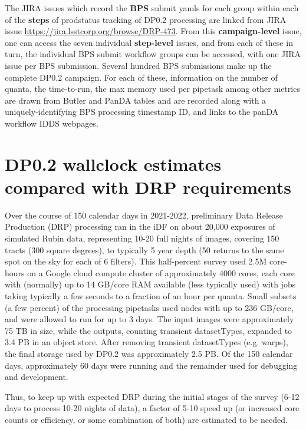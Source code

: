 \documentclass[OPS,authoryear,toc]{lsstdoc}
\begin{document}
The JIRA issues which record the {\bf BPS} submit yamls for each group
within each of the {\bf steps} of {\rm prodstatus} tracking of DP0.2
processing are linked from JIRA issue
\url{https://jira.lsstcorp.org/browse/DRP-473}.  From this 
{\bf campaign-level} issue, one can access the seven individual {\bf step-level}
issues, and from each of these in turn, the individual BPS submit
workflow groups can be accessed, with one JIRA issue per BPS submission. 
Several hundred BPS submissions make up the complete DP0.2 campaign.
For each of these, information on the number of quanta, 
the time-to-run, the max memory used per pipetask among 
other metrics are drawn from Butler and PanDA tables and are 
recorded along with a uniquely-identifying BPS processing timestamp ID, 
and links to the panDA workflow IDDS webpages.

\section{DP0.2 wallclock estimates compared with DRP requirements}

Over the course of 150 calendar days in 2021-2022, preliminary Data
Release Production (DRP) processing ran in the iDF on about 20,000
exposures of simulated Rubin data, representing 10-20 full nights of
images, covering 150 tracts (300 square degrees), to typically 5 year
depth (50 returns to the same spot on the sky for each of 6 filters).
This half-percent survey used 2.5M core-hours on a Google cloud compute 
cluster of approximately 4000 cores, each core with (normally) up 
to 14 GB/core RAM available (less typically used) with jobs 
taking typically a few seconds to a fraction of an hour per quanta.  
Small subsets (a few percent) of the processing pipetasks used nodes 
with up to 236 GB/core, and were allowed to run for up to 3 days.  
The input images were approximately 75 TB in size, while the outputs, 
counting transient datasetTypes, expanded to 3.4 PB in an object store.  
After removing transient datasetTypes (e.g. warps), the final storage 
used by DP0.2 was approximately 2.5 PB.  Of the 150 calendar days, 
approximately 60 days were running and the remainder used for 
debugging and development.

Thus, to keep up with expected DRP during the initial stages of the survey
(6-12 days to process 10-20 nights of data), a factor of 5-10 speed up
(or increased core counts or efficiency, or some combination of both) 
are estimated to be needed.   


\appendix
\end{document}
